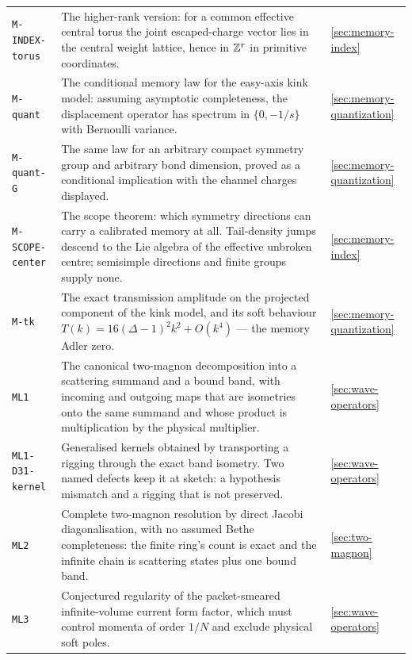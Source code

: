 {\begin{longtable}{@{}p{}p{}p{}@{}}
\texttt{M-INDEX-torus} & The higher-rank version: for a common effective
central torus the joint escaped-charge vector lies in the central weight
lattice, hence in $\mathbb{Z}^r$ in primitive coordinates. & \cref{sec:memory-index}\\

\texttt{M-quant} & The conditional memory law for the easy-axis kink model:
assuming asymptotic completeness, the displacement operator has spectrum in
$\{0,-1/s\}$ with Bernoulli variance. & \cref{sec:memory-quantization}\\

\texttt{M-quant-G} & The same law for an arbitrary compact symmetry group and
arbitrary bond dimension, proved as a conditional implication with the channel
charges displayed. & \cref{sec:memory-quantization}\\

\texttt{M-SCOPE-center} & The scope theorem: which symmetry directions can
carry a calibrated memory at all. Tail-density jumps descend to the Lie
algebra of the effective unbroken centre; semisimple directions and finite
groups supply none. & \cref{sec:memory-index}\\

\texttt{M-tk} & The exact transmission amplitude on the projected component of
the kink model, and its soft behaviour $T(k)=16(\Delta-1)^2k^2+O(k^4)$ --- the
memory Adler zero. & \cref{sec:memory-quantization}\\

\texttt{ML1} & The canonical two-magnon decomposition into a scattering
summand and a bound band, with incoming and outgoing maps that are isometries
onto the same summand and whose product is multiplication by the physical
multiplier. & \cref{sec:wave-operators}\\

\texttt{ML1-D31-kernel} & Generalised kernels obtained by transporting a
rigging through the exact band isometry. Two named defects keep it at sketch:
a hypothesis mismatch and a rigging that is not preserved. & \cref{sec:wave-operators}\\

\texttt{ML2} & Complete two-magnon resolution by direct Jacobi
diagonalisation, with no assumed Bethe completeness: the finite ring's count
is exact and the infinite chain is scattering states plus one bound band. & \cref{sec:two-magnon}\\

\texttt{ML3} & Conjectured regularity of the packet-smeared infinite-volume
current form factor, which must control momenta of order $1/N$ and exclude
physical soft poles. & \cref{sec:wave-operators}\\


\end{longtable}}
